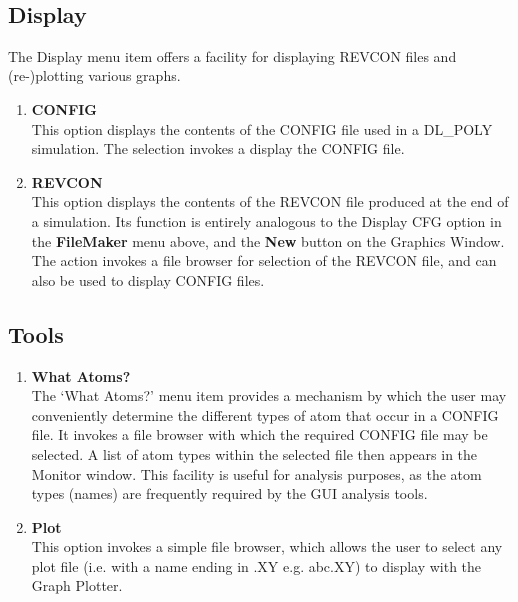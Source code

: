 \begin{enumerate}
~

\end{enumerate}

\subsection{Display}
The Display menu item offers a facility for displaying REVCON files
and (re-)plotting various graphs.
\begin{enumerate}
\item {\bf CONFIG}\\
This option displays the contents of the CONFIG file used in a DL\_POLY
simulation. The selection invokes a display the CONFIG file.
\item {\bf REVCON}\\
This option displays the contents of the REVCON file produced at the
end of a \DD{} simulation. Its function is entirely analogous to the
Display CFG option in the {\bf FileMaker} menu above, and the {\bf
New} button on the Graphics Window. The action invokes a file browser
for selection of the REVCON file, and can also be used to display
CONFIG files.
\end{enumerate}

\subsection{Tools}

\label{whatatoms}
\begin{enumerate}
\item {\bf What Atoms?}\\
The `What Atoms?' menu item provides a mechanism by which the user may
conveniently determine the different types of atom that occur in a
CONFIG file. It invokes a file browser with which the required CONFIG
file may be selected. A list of atom types within the selected file
then appears in the Monitor window. This facility is useful for
analysis purposes, as the atom types (names) are frequently required
by the GUI analysis tools.
\item {\bf Plot}\\
This option invokes a simple file browser, which allows the user to select
any plot file (i.e. with a name ending in .XY  e.g. abc.XY) to display with
the Graph Plotter.
\end{enumerate}

